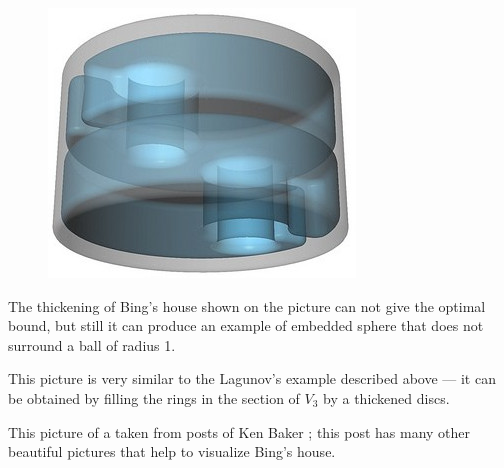 \begin{figure}
\vskip-0mm
\centering
\includegraphics[scale=.45]{pics/thickened-bing's-house}
\vskip-0mm
\end{figure}

The thickening of Bing's house shown on the picture can not give the optimal bound,
but still it can produce an example of embedded sphere that does not surround a ball of radius 1.

This picture is very similar to the Lagunov's example described above --- it can be obtained by filling the rings in the section of $V_3$ by a thickened discs. 

This picture of a taken from posts of Ken Baker \cite{baker};
this post has many other beautiful pictures that help to visualize Bing's house.

